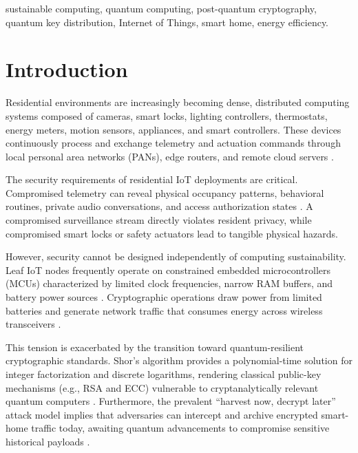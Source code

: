 \documentclass[journal]{IEEEtran}
\begin{document}
\begin{IEEEkeywords}
sustainable computing, quantum computing, post-quantum cryptography, quantum key
distribution, Internet of Things, smart home, energy efficiency.
\end{IEEEkeywords}


\section{Introduction}

Residential environments are increasingly becoming dense, distributed computing systems
composed of cameras, smart locks, lighting controllers, thermostats, energy meters, motion
sensors, appliances, and smart controllers. These devices continuously process and exchange
telemetry and actuation commands through local personal area networks (PANs), edge routers,
and remote cloud servers \cite{nist8259a,nist8259,lin2017survey}.

The security requirements of residential IoT deployments are critical. Compromised telemetry
can reveal physical occupancy patterns, behavioral routines, private audio conversations,
and access authorization states \cite{alrawi2019sok}. A compromised surveillance stream directly
violates resident privacy, while compromised smart locks or safety actuators lead to
tangible physical hazards.

However, security cannot be designed independently of computing sustainability. Leaf IoT nodes
frequently operate on constrained embedded microcontrollers (MCUs) characterized by limited
clock frequencies, narrow RAM buffers, and battery power sources \cite{gungor2021sustainable,minerva2015towards}.
Cryptographic operations draw power from limited batteries and generate network traffic that
consumes energy across wireless transceivers \cite{khan2020energy}.

This tension is exacerbated by the transition toward quantum-resilient cryptographic
standards. Shor's algorithm provides a polynomial-time solution for integer factorization
and discrete logarithms, rendering classical public-key mechanisms (e.g., RSA and ECC)
vulnerable to cryptanalytically relevant quantum computers \cite{shor,bernstein2017post}.
Furthermore, the prevalent ``harvest now, decrypt later'' attack model implies that
adversaries can intercept and archive encrypted smart-home traffic today, awaiting quantum
advancements to compromise sensitive historical payloads \cite{mosca,mavroeidis2018impact}.
\end{document}
